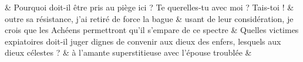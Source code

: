 \documentclass[12pt,onecolumn,twoside,a4paper]{memoir}
\begin{document}
\begin{pairs}
\begin{Rightside}
                            \&
                         \stanza 
                      Pourquoi doit-il être pris au piège ici ? Te querelles-tu avec moi ?
                              Tais-toi ! \&
                         \stanza 
                      outre sa résistance, j’ai retiré de force la bague \&
                         \stanza 
                      usant de leur considération, je crois que les Achéens permettront
                              qu’il s’empare de ce spectre \&
                         \stanza 
                      Quelles victimes expiatoires doit-il juger dignes de convenir aux
                              dieux des enfers, lesquels aux dieux célestes ? \&
                         \stanza 
                      à l’amante superstitieuse avec l’épouse troublée  \&
                     
                  \endnumbering
		\end{Rightside}
               \end{pairs}
	\Columns
            
            
\end{document}
